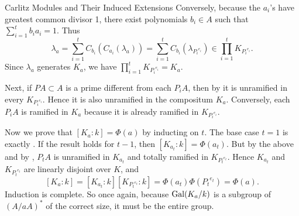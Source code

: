 \documentclass[12pt]{article}
\begin{document}
\begin{section}{Carlitz Modules and Their Induced Extensions}
Conversely, because the $a_i$'s have greatest common divisor 1, there
exist polynomials $b_i \in A$ such that $\sum^t_{i=1}b_ia_i = 1$.  Thus
$$\lambda_a = \sum^t_{i=1}C_{b_i}(C_{a_i}(\lambda_a)) =
\sum^t_{i=1}C_{b_i}(\lambda_{{P_i}^{e_i}}) \in
\prod^t_{i=1} K_{{P_i}^{e_i}}.$$
Since $\lambda_a$ generates $K_a$, we have
$\prod^t_{i=1} K_{{P_i}^{e_i}} = K_a$.

Next, if $PA \subset A$ is a prime different from each $P_iA$, then by
 it is unramified in every $K_{{P_i}^{e_i}}$.  Hence it
is also unramified in the compositum $K_a$.  Conversely, each $P_iA$ is
ramified in $K_a$ because it is already ramified in $K_{{P_i}^{e_i}}$.

Now we prove that $[K_a:k] = \Phi(a)$ by inducting on $t$.  The base case
$t = 1$ is exactly .  If the result holds for $t-1$,
then $[K_{a_t}:k] = \Phi(a_t)$.  But by the above and by
, $P_tA$ is unramified in $K_{a_t}$ and totally ramified
in $K_{{P_t}^{e_t}}$.  Hence $K_{a_t}$ and $K_{{P_t}^{e_t}}$ are linearly
disjoint over $K$, and $$[K_a:k] = [K_{a_t}:k][K_{{P_t}^{e_t}}:k]
= \Phi(a_t)\Phi({P_t}^{e_t}) = \Phi(a).$$
Induction is complete.  So once again, because $\operatorname{Gal}(K_a/k)$ is a
subgroup of $(A/aA)^*$ of the correct size, it must be the entire group.
\hamlos

\end{section} %
\end{document}
